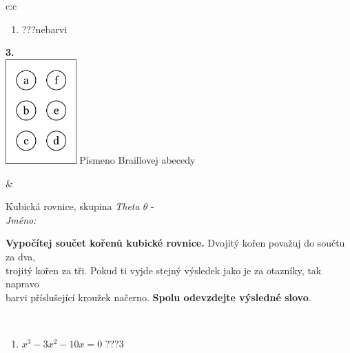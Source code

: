 \documentclass[10pt]{report}
\begin{document}
\begin{tabular}{c:c}
\begin{minipage}[c][104.5mm][t]{0.5\linewidth}
\begin{center}
\begin{minipage}{0.79\linewidth}
\begin{center}
\begin{varwidth}{\linewidth}
\begin{enumerate}
\item \quad \dotfill\; ???\;\dotfill \quad nebarvi
\end{enumerate}
\end{varwidth}
\end{center}
\end{minipage}
\begin{minipage}{0.20\linewidth}
\begin{center}
{\Huge\bfseries 3.} \\[2mm]
\includegraphics[height=40mm]{../images/braille.png}
{\small Písmeno Braillovej abecedy}
\end{center}
\end{minipage}
\end{center}
\end{minipage}
&
\begin{minipage}[c][104.5mm][t]{0.5\linewidth}
\begin{center}
\vspace{7mm}
{\huge Kubická rovnice, skupina \textit{Theta $\theta$} -}\\[5mm]
\textit{Jméno:}\phantom{xxxxxxxxxxxxxxxxxxxxxxxxxxxxxxxxxxxxxxxxxxxxxxxxxxxxxxxxxxxxxxxxx}\\[5mm]
\begin{minipage}{0.95\linewidth}
\begin{center}
\textbf{Vypočítej součet kořenů kubické rovnice.} Dvojitý kořen považuj do součtu za dva,\\trojitý kořen za tři. Pokud ti vyjde stejný výsledek jako je za otazníky, tak napravo\\barvi příslušející kroužek načerno. \textbf{Spolu odevzdejte výsledné slovo}.
\end{center}
\end{minipage}
\\[1mm]
\begin{minipage}{0.79\linewidth}
\begin{center}
\begin{varwidth}{\linewidth}
\begin{enumerate}
\Large
\item $x^3-3x^2-10x=0$\quad \dotfill\; ???\;\dotfill \quad $3$

\end{enumerate}
\end{varwidth}
\end{center}
\end{minipage}
\end{center}
\end{minipage}
\end{tabular}
\end{document}
